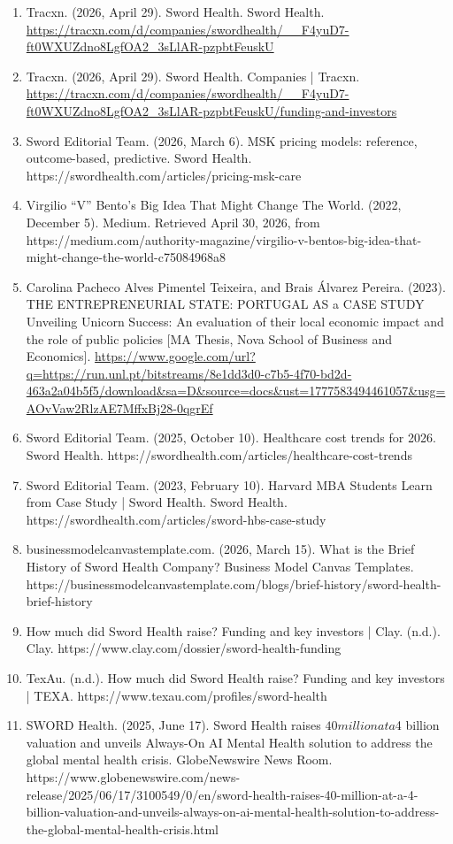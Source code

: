 \documentclass[12pt]{article}
\begin{document}
\begin{enumerate}
    \item Tracxn. (2026, April 29). Sword Health. Sword Health. \url{https://tracxn.com/d/companies/swordhealth/__F4yuD7-ft0WXUZdno8LgfOA2_3sLlAR-pzpbtFeuskU}
    \item Tracxn. (2026, April 29). Sword Health. Companies | Tracxn. \url{https://tracxn.com/d/companies/swordhealth/__F4yuD7-ft0WXUZdno8LgfOA2_3sLlAR-pzpbtFeuskU/funding-and-investors}
    \item Sword Editorial Team. (2026, March 6). MSK pricing models: reference, outcome-based, predictive. Sword Health. https://swordhealth.com/articles/pricing-msk-care
    \item Virgilio “V” Bento’s Big Idea That Might Change The World. (2022, December 5). Medium. Retrieved April 30, 2026, from https://medium.com/authority-magazine/virgilio-v-bentos-big-idea-that-might-change-the-world-c75084968a8
    \item Carolina Pacheco Alves Pimentel Teixeira, and Brais Álvarez Pereira. (2023). THE ENTREPRENEURIAL STATE: PORTUGAL AS a CASE STUDY Unveiling Unicorn Success: An evaluation of their local economic impact and the role of public policies [MA Thesis, Nova School of Business and Economics]. \url{https://www.google.com/url?q=https://run.unl.pt/bitstreams/8e1dd3d0-c7b5-4f70-bd2d-463a2a04b5f5/download&sa=D&source=docs&ust=1777583494461057&usg=AOvVaw2RlzAE7MffxBj28-0qgrEf}
    \item Sword Editorial Team. (2025, October 10). Healthcare cost trends for 2026. Sword Health. https://swordhealth.com/articles/healthcare-cost-trends
    \item Sword Editorial Team. (2023, February 10). Harvard MBA Students Learn from Case Study | Sword Health. Sword Health. https://swordhealth.com/articles/sword-hbs-case-study
    \item businessmodelcanvastemplate.com. (2026, March 15). What is the Brief History of Sword Health Company? Business Model Canvas Templates. https://businessmodelcanvastemplate.com/blogs/brief-history/sword-health-brief-history
    \item How much did Sword Health raise? Funding and key investors | Clay. (n.d.). Clay. https://www.clay.com/dossier/sword-health-funding
    \item TexAu. (n.d.). How much did Sword Health raise? Funding and key investors | TEXA. https://www.texau.com/profiles/sword-health
    \item SWORD Health. (2025, June 17). Sword Health raises $40 million at a $4 billion valuation and unveils Always-On AI Mental Health solution to address the global mental health crisis. GlobeNewswire News Room. https://www.globenewswire.com/news-release/2025/06/17/3100549/0/en/sword-health-raises-40-million-at-a-4-billion-valuation-and-unveils-always-on-ai-mental-health-solution-to-address-the-global-mental-health-crisis.html

\end{enumerate}
\end{document}
